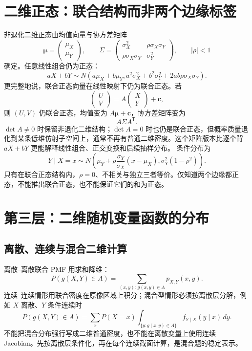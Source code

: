 \documentclass[11pt,a4paper]{ctexart}
\begin{document}
\section{二维正态：联合结构而非两个边缘标签}

非退化二维正态由均值向量与协方差矩阵
\[
\boldsymbol\mu=\begin{pmatrix}\mu_X\\\mu_Y\end{pmatrix},\qquad
\Sigma=\begin{pmatrix}
\sigma_X^2&\rho\sigma_X\sigma_Y\\
\rho\sigma_X\sigma_Y&\sigma_Y^2
\end{pmatrix},\qquad \lvert\rho\rvert<1
\]
确定。任意线性组合仍为正态：
\[
aX+bY\sim N\left(a\mu_X+b\mu_Y,
a^2\sigma_X^2+b^2\sigma_Y^2+2ab\rho\sigma_X\sigma_Y\right).
\]
更完整地说，联合正态向量在线性映射下仍为联合正态。若
\[
\begin{pmatrix}U\\V\end{pmatrix}
=A\begin{pmatrix}X\\Y\end{pmatrix}+\boldsymbol c,
\]
则 $(U,V)$ 仍联合正态，均值变为 $A\boldsymbol\mu+\boldsymbol c$，协方差矩阵变为
\[
A\Sigma A^{\mathsf T}.
\]
$\det A\ne0$ 时保留非退化二维结构；$\det A=0$ 时也仍是联合正态，但概率质量退化到某条低维仿射子空间上，通常不再有普通二维密度。这个矩阵版本比逐个背 $aX+bY$ 更能解释线性组合、正交变换和后续抽样分布。
条件分布为
\[
Y\mid X=x\sim N\left(
\mu_Y+\rho\frac{\sigma_Y}{\sigma_X}(x-\mu_X),
\sigma_Y^2(1-\rho^2)
\right).
\]
只有在联合正态结构内，$\rho=0$、不相关与独立三者等价。仅知道两个边缘都正态，不能推出联合正态，也不能保证它们的和为正态。

\section{第三层：二维随机变量函数的分布}

\subsection{离散、连续与混合二维计算}

离散--离散联合 PMF 用求和降维：
\[
P(g(X,Y)\in A)=\sum_{(x,y):\,g(x,y)\in A}p_{X,Y}(x,y).
\]
连续--连续情形用联合密度在原像区域上积分；混合型情形必须按离散层分解，例如 $X$ 离散、$Y$ 条件连续时
\[
P(g(X,Y)\in A)=\sum_xP(X=x)\int_{\{y:g(x,y)\in A\}}f_{Y\mid X}(y\mid x)\,dy.
\]
不能把混合分布强行写成二维普通密度，也不能在离散变量上使用连续 Jacobian。先按离散层条件化，再在每个连续截面计算，是混合题的稳定表示。
\end{document}
